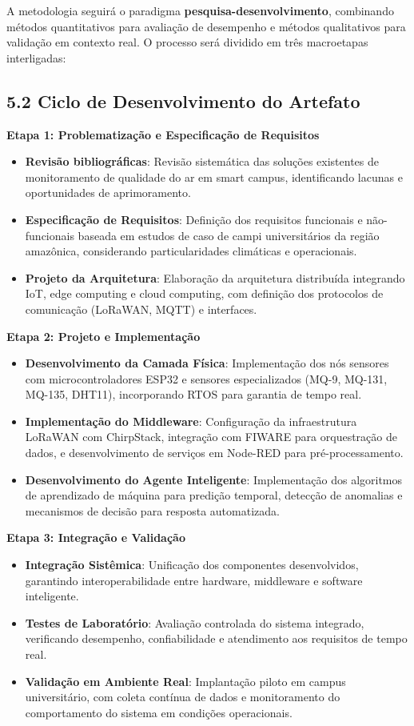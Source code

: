 \documentclass[12pt, a4paper]{article}
\begin{document}
A metodologia seguirá o paradigma \textbf{pesquisa-desenvolvimento}, 
combinando métodos quantitativos para avaliação de desempenho e métodos qualitativos para validação em contexto real.
 O processo será dividido em três macroetapas interligadas:

\subsection*{5.2 Ciclo de Desenvolvimento do Artefato}

\textbf{Etapa 1: Problematização e Especificação de Requisitos}
\begin{itemize}
    \item \textbf{Revisão bibliográficas}: Revisão sistemática das soluções existentes de monitoramento 
    de qualidade do ar em smart campus, identificando lacunas e oportunidades de aprimoramento.
    \item \textbf{Especificação de Requisitos}: Definição dos requisitos funcionais e não-funcionais baseada em estudos 
    de caso de campi universitários da região amazônica, considerando particularidades climáticas e operacionais.
    \item \textbf{Projeto da Arquitetura}: Elaboração da arquitetura distribuída integrando IoT, edge computing e cloud 
    computing, com definição dos protocolos de comunicação (LoRaWAN, MQTT) e interfaces.
\end{itemize}

\textbf{Etapa 2: Projeto e Implementação}
\begin{itemize}
    \item \textbf{Desenvolvimento da Camada Física}: Implementação dos nós sensores com microcontroladores ESP32 e
     sensores especializados (MQ-9, MQ-131, MQ-135, DHT11), incorporando RTOS para garantia de tempo real.
    \item \textbf{Implementação do Middleware}: Configuração da infraestrutura LoRaWAN com ChirpStack, integração com 
    FIWARE para orquestração de dados, e desenvolvimento de serviços em Node-RED para pré-processamento.
    \item \textbf{Desenvolvimento do Agente Inteligente}: Implementação dos algoritmos de aprendizado de máquina para 
    predição temporal, detecção de anomalias e mecanismos de decisão 
    para resposta automatizada.
\end{itemize}

\textbf{Etapa 3: Integração e Validação}
\begin{itemize}
    \item \textbf{Integração Sistêmica}: Unificação dos componentes desenvolvidos, garantindo interoperabilidade entre 
    hardware, middleware e software inteligente.
    \item \textbf{Testes de Laboratório}: Avaliação controlada do sistema integrado, verificando 
    desempenho, confiabilidade e atendimento aos requisitos de tempo real.
    \item \textbf{Validação em Ambiente Real}: Implantação piloto em campus universitário, 
    com coleta contínua de dados e monitoramento do comportamento do sistema em condições operacionais.
\end{itemize}
\end{document}
